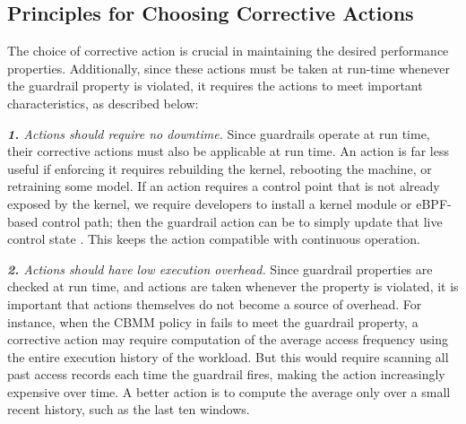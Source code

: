 

\subsection{Principles for Choosing Corrective Actions}
\label{subsec:action-principles}

The choice of corrective action is crucial in maintaining the desired performance properties. Additionally, since these actions must be taken at run-time whenever the guardrail property is violated, it requires the actions to meet important characteristics, as described below:

\medskip\noindent
{\em \textbf{1.} Actions should require no downtime.}
Since guardrails operate at run time, their corrective actions must also be applicable at run time.
An action is far less useful if enforcing it requires rebuilding the kernel, rebooting the machine, or retraining some model.
If an action requires a control point that is not already exposed by the kernel, we require developers to install a kernel module or eBPF-based control path; then the guardrail action can be to simply update that live control state . This keeps the action compatible with continuous operation.

\medskip\noindent
{\em \textbf{2.} Actions should have low execution overhead.}
Since guardrail properties are checked at run time, and actions are taken whenever the property is violated, it is important that actions themselves do not become a source of overhead.
For instance, when the CBMM policy in  fails to meet the guardrail property, a corrective action may require computation of the average access frequency using the entire execution history of the workload.
But this would require scanning all past access records each time the guardrail fires, making the action increasingly expensive over time. A better action is to compute the average only over a small recent history, such as the last ten windows.


